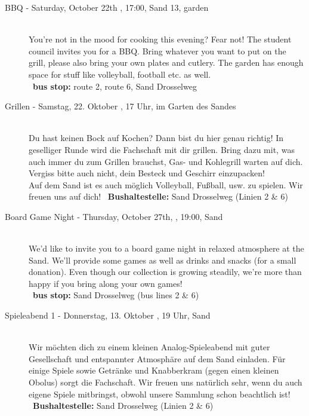\begin{description}
\ifml
	\item[BBQ - Saturday, October 22th \YEAR, 17:00, Sand 13, garden]~\\
	You're not in the mood for cooking this evening? Fear not!
    The student council invites you for a BBQ. Bring whatever you want to put on the grill,
    please also bring your own plates and cutlery. The garden has enough space for stuff like volleyball, football etc. as well.\\
	~\textbf{bus stop:} route 2, route 6, Sand Drosselweg
\else
	\item[Grillen - Samstag, 22. Oktober \YEAR, 17 Uhr, im Garten des Sandes]~\\
	Du hast keinen Bock auf Kochen? Dann bist du hier genau richtig! In geselliger Runde wird die Fachschaft mit dir grillen.
	Bring dazu mit, was auch immer du zum Grillen brauchst, Gas- und Kohlegrill warten auf dich. Vergiss bitte auch nicht, dein Besteck und Geschirr einzupacken!\\
	Auf dem Sand ist es auch möglich Volleyball, Fußball, usw. zu spielen. Wir freuen uns auf dich!
	~\textbf{Bushaltestelle:} Sand Drosselweg (Linien 2 \& 6)
\fi

\ifbachelor
\pagebreak
\fi


\ifml
	\item[Board Game Night - Thursday, October 27th, \YEAR, 19:00, Sand]\ \\
	We'd like to invite you to a board game night in relaxed atmosphere at the Sand.
	We'll provide some games as well as drinks and snacks (for a small donation).
	Even though our collection is growing steadily, we're more than happy if you bring along your own games!\\
	~\textbf{bus stop:} Sand Drosselweg (bus lines 2 \& 6)
\else
    \item[Spieleabend 1 - Donnerstag, 13. Oktober \YEAR, 19 Uhr, Sand]~\\
	Wir möchten dich zu einem kleinen Analog-Spieleabend mit guter Gesellschaft und entspannter Atmosphäre auf dem Sand einladen.
	Für einige Spiele sowie Getränke und Knabberkram (gegen einen kleinen Obolus) sorgt die Fachschaft.
	Wir freuen uns natürlich sehr, wenn du auch eigene Spiele mitbringst, obwohl unsere Sammlung schon beachtlich ist!\\
	~\textbf{Bushaltestelle:} Sand Drosselweg (Linien 2 \& 6)
\fi



\end{description}
